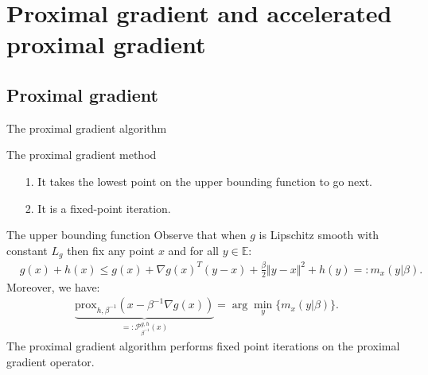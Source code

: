 \documentclass[11pt]{beamer}
\begin{document}
        
\section{Proximal gradient and accelerated proximal gradient}
    \subsection{Proximal gradient}
        \begin{frame}{The proximal gradient algorithm}
            \begin{block}{The proximal gradient method}
                \begin{algorithm}[H]
                    \scriptsize
                    \begin{algorithmic}[1]
                        \ENDIF
                    \ENDFOR
                    \end{algorithmic}
                    \caption{Proximal gradient with fixed step-sizes}
                    \label{alg:1}
                \end{algorithm}
            \end{block}
            \begin{itemize}
                \item [1.] It takes the lowest point on the upper bounding function to go next. 
                \item [2.] It is a fixed-point iteration.
            \end{itemize}
        \end{frame}
        \begin{frame}{The upper bounding function}
            Observe that when $g$ is Lipschitz smooth with constant $L_g$ then fix any point $x$ and for all $y\in \mathbb E$:  
            \begin{align*}
                & g(x) + h(x) \le 
                g(x) + \nabla g(x)^T(y - x) + \frac{\beta}{2} \Vert y - x\Vert^2
                + h(y) =: m_x(y|\beta). 
            \end{align*}
            Moreover, we have: 
            \begin{align*}
                \underbrace{
                    \text{prox}_{h, \beta^{-1}}(x - \beta^{-1}\nabla g(x))
                    }_{
                        =:\mathcal P_{\beta^{-1}}^{g, h}(x)
                    } 
                = \arg\min_{y} \{m_x(y|\beta)\}.  
            \end{align*}
            The proximal gradient algorithm performs fixed point iterations on the proximal gradient operator. 
        \end{frame}
\end{document}
